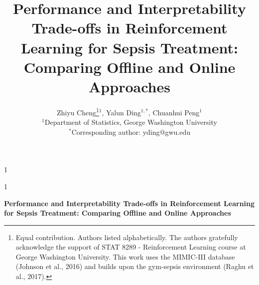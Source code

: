 \documentclass[11pt]{article}
\newcommand{\anon}{1}  %
\begin{document}
\def\spacingset#1{\renewcommand{\baselinestretch}{#1}\small\normalsize}
\spacingset{1}

\anon
{
  \title{\bf Performance and Interpretability Trade-offs in Reinforcement Learning for Sepsis Treatment: Comparing Offline and Online Approaches}
  \author{
    Zhiyu Cheng\thanks{Equal contribution. Authors listed alphabetically. The authors gratefully acknowledge the support of STAT 8289 - Reinforcement Learning course at George Washington University. This work uses the MIMIC-III database (Johnson et al., 2016) and builds upon the gym-sepsis environment (Raghu et al., 2017).}$^{1}$,
    Yalun Ding$^{1,*}$,
    Chuanhui Peng$^{1}$ \\
    $^{1}$Department of Statistics, George Washington University \\
    $^{*}$Corresponding author: yding@gwu.edu
  }
  \maketitle
} \fi

\anon
{
  \bigskip
  \bigskip
  \bigskip
  \begin{center}
    {\LARGE\bf Performance and Interpretability Trade-offs in Reinforcement Learning for Sepsis Treatment: Comparing Offline and Online Approaches}
\end{center}
  \medskip
} \fi
\end{document}
